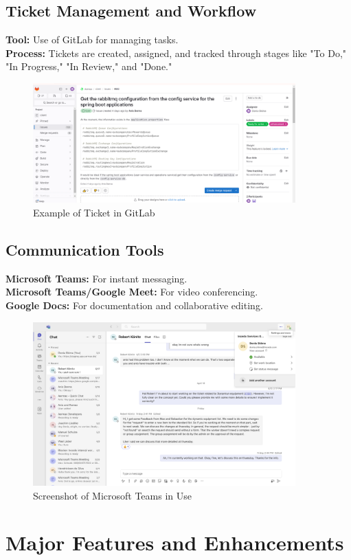 \subsection{Ticket Management and Workflow}
\textbf{Tool:} Use of GitLab for managing tasks. \\
\textbf{Process:} Tickets are created, assigned, and tracked through stages like "To Do," "In Progress," "In Review," and "Done."
\begin{figure}[H]
    \centering
    \includegraphics[width=0.9\textwidth]{src/assets/chapters/ticket.PNG}
    \caption{Example of Ticket in GitLab}
    \label{fig:ticket_management}
\end{figure}

\subsection{Communication Tools}
\textbf{Microsoft Teams:} For instant messaging. \\
\textbf{Microsoft Teams/Google Meet:} For video conferencing. \\
\textbf{Google Docs:} For documentation and collaborative editing.
\begin{figure}[H]
    \centering
    \includegraphics[width=0.9\textwidth]{src/assets/chapters/MicrosoftTeams.png}
    \caption{Screenshot of Microsoft Teams in Use}
    \label{fig:communication_tools}
\end{figure}

\section{Major Features and Enhancements}
